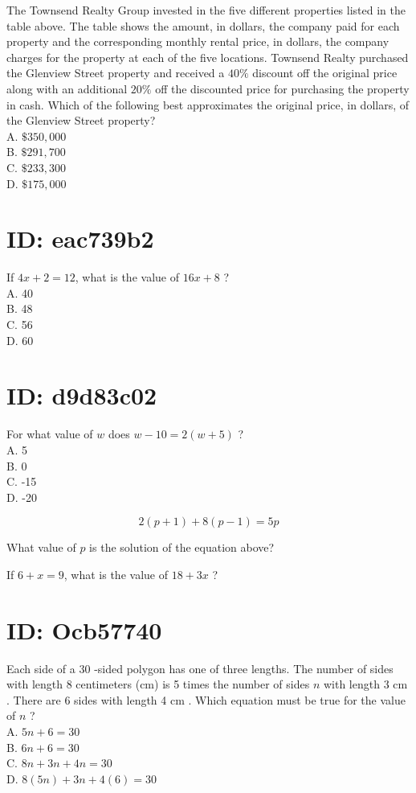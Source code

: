 The Townsend Realty Group invested in the five different properties listed in the table above. The table shows the amount, in dollars, the company paid for each property and the corresponding monthly rental price, in dollars, the company charges for the property at each of the five locations. Townsend Realty purchased the Glenview Street property and received a $40 \%$ discount off the original price along with an additional $20 \%$ off the discounted price for purchasing the property in cash. Which of the following best approximates the original price, in dollars, of the Glenview Street property?\\
A. $\$ 350,000$\\
B. $\$ 291,700$\\
C. $\$ 233,300$\\
D. $\$ 175,000$

\section*{ID: eac739b2}
If $4 x+2=12$, what is the value of $16 x+8$ ?\\
A. 40\\
B. 48\\
C. 56\\
D. 60

\section*{ID: d9d83c02}
For what value of $w$ does $w-10=2(w+5)$ ?\\
A. 5\\
B. 0\\
C. -15\\
D. -20

$$
2(p+1)+8(p-1)=5 p
$$

What value of $p$ is the solution of the equation above?

If $6+x=9$, what is the value of $18+3 x$ ?

\section*{ID: Ocb57740}
Each side of a 30 -sided polygon has one of three lengths. The number of sides with length 8 centimeters (cm) is 5 times the number of sides $n$ with length 3 cm . There are 6 sides with length 4 cm . Which equation must be true for the value of $n$ ?\\
A. $5 n+6=30$\\
B. $6 n+6=30$\\
C. $8 n+3 n+4 n=30$\\
D. $8(5 n)+3 n+4(6)=30$

